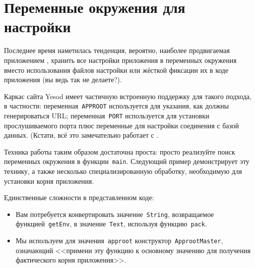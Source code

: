 \chapter{Переменные окружения для настройки}

Последнее время наметилась тенденция, вероятно, наиболее продвигаемая
приложением , хранить все
настройки приложения в переменных окружения вместо использования файлов
настройки или жёсткой фиксации их в коде приложения (вы ведь так не делаете?).

Каркас сайта Yesod имеет частичную встроенную поддержку для такого подхода, в
частности: переменная~\lstinline'APPROOT' используется для указания, как должны
генерироваться URL; переменная~\lstinline'PORT' используется для установки
прослушиваемого порта плюс переменные для настройки соединения с базой данных.
(Кстати, всё это замечательно работает с
.

Техника работы таким образом достаточна проста: просто реализуйте поиск
переменных окружения в функции~\lstinline'main'. Следующий пример демонстрирует
эту технику, а также несколько специализированную обработку, необходимую для
установки корня приложения.


Единственные сложности в представленном коде:
\begin{itemize}
    \item Вам потребуется конвертировать значение~\lstinline'String',
        возвращаемое функцией~\lstinline'getEnv', в значение~\lstinline'Text',
        используя функцию~\lstinline'pack'.

    \item Мы используем для значения~\lstinline'approot'
        конструктор~\lstinline'ApprootMaster', означающий <<примени эту функцию
        к основному значению для получения фактического корня приложения>>.
\end{itemize}
